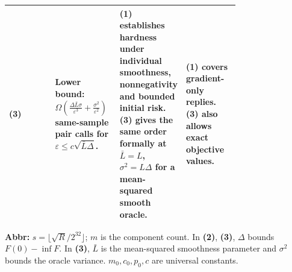 \begin{table}[tp]
\begin{threeparttable}
\begin{tabularx}{\linewidth}{@{}>{\raggedright\arraybackslash}p{0.20\linewidth}>{\raggedright\arraybackslash}p{0.28\linewidth}>{\raggedright\arraybackslash}p{0.28\linewidth}>{\raggedright\arraybackslash}X@{}}
\midrule
\textbf{(3)} \citep[Thm.~3, Eq.~(24)]{hdabcArjevaniV2}
& Lower bound: $\Omega\!\left(\frac{\Delta\bar L\sigma}{\varepsilon^3}+\frac{\sigma^2}{\varepsilon^2}\right)$ same-sample pair calls for $\varepsilon\le c\sqrt{\bar L\Delta}$.
& \textbf{(1)} establishes hardness under individual smoothness, nonnegativity and bounded initial risk. \textbf{(3)} gives the same order formally at $\bar L=L$, $\sigma^2=L\Delta$ for a mean-squared smooth oracle.
& \textbf{(1)} covers gradient-only replies. \textbf{(3)} also allows exact objective values. \\
\bottomrule
\end{tabularx}
\begin{tablenotes}[flushleft]\footnotesize
\item[] \textbf{Abbr:} $s=\lfloor\sqrt R/2^{32}\rfloor$; $m$ is the component count. In \textbf{(2)}, \textbf{(3)}, $\Delta$ bounds $F(0)-\inf F$. In \textbf{(3)}, $\bar L$ is the mean-squared smoothness parameter and $\sigma^2$ bounds the oracle variance. $m_0,c_0,p_0,c$ are universal constants.
\end{tablenotes}
\end{threeparttable}
\end{table}
